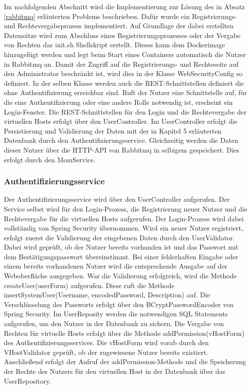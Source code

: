 Im nachfolgenden Abschnitt wird die Implementierung zur Lösung des in Absatz \ref{rabbitmq} erläuterten Problems beschrieben. Dafür wurde ein Registrierungs- und Rechtevergabeprozess implementiert. Auf Grundlage der dabei erstellten Datensätze wird zum Abschluss eines Registrierungsprozesses oder der Vergabe von Rechten das init.sh Shellskript erstellt. Dieses kann dem Dockerimage hinzugefügt werden und legt beim Start eines Containers automatisch die Nutzer in Rabbitmq an.
Damit der Zugriff auf die Registrierungs- und Rechteseite auf den Administrator beschränkt ist, wird dies in der Klasse WebSecurityConfig so definiert. In der selben Klasse werden auch die REST-Schnittstellen definiert die ohne Authentifizierung erreichbar sind. Ruft der Nutzer eine Schnittstelle auf, für die eine Authentifizierung oder eine andere Rolle notwendig ist, erscheint ein Login-Fenster. Die REST-Schnittstellen für den Login und die Rechtevergabe der virtuellen Hosts erfolgt über den UserController. Im UserController erfolgt die Persistierung und Validierung der Daten mit der in Kapitel 5 erläuterten Datenbank durch den Authentifizierungsservice. Gleichzeitig werden die Daten dieser Nutzer über die HTTP-API von Rabbitmq in selbigem gespeichert. Dies erfolgt durch den MomService.
\subsubsection{Authentifizierungsservice}\label{momservice}
Der Authentifizierungsservice wird über den UserController aufgerufen. Der Service selbst wird für den Login-Prozess, die Registrierung neuer Nutzer und die Rechtevergabe für die virtuellen Hosts aufgerufen. Der Login-Prozess wird dabei vollständig von Spring Security übernommen. Wird ein neuer Nutzer registriert, erfolgt zuerst die Validierung der eingebenen Daten durch den UserValidator. Dabei wird geprüft, ob der Nutzer bereits vorhanden ist und das Passwort mit dem Bestätigungspasswort übereinstimmt. Bei einer fehlerhaften Eingabe oder einem bereits vorhandenen Nutzer wird die entsprechende Ausgabe auf der Weboberfläche ausgegeben. War die Validierung erfolgreich, wird die Methode createUser(userForm) aufgerufen. Diese ruft die Methode insertSystemUser(Username, encodedPassword, Description) auf. Die Verschlüsselung des Passworts erfolgt über den BCryptPasswordEncoder von Spring Security. Im UserReposity werden die notwendigen SQL Statements aufgerufen, um den Nutzer in der Datenbank zu sichern. Die Vergabe von Rechten für virtuelle Hosts erfolgt über die Methode addPermission(vHostForm) des Authentifizierungsservices. Die vHostForm wird vorab durch den VHostValidator geprüft, ob der zugewiesene Nutzer bereits existiert. Anschließend erfolgt der Aufruf der addPermission-Methode und die Speicherung der Rechte des Nutzers für den virtuellen Host in der Datenbank über das UserRepository.
